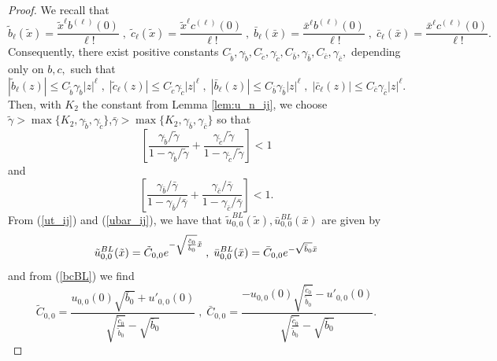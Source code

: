 \documentclass[12pt]{article}
\begin{document}
\begin{proof}
We recall that
\begin{equation*}
\tilde{b}_{\ell}(\tilde{x}) = \frac{\tilde{x}^{\ell} b^{(\ell)}(0)}{\ell !} \; , \; \tilde{c}_{\ell}(\tilde{x}) = \frac{\tilde{x}^{\ell} c^{(\ell)}(0)}{\ell !} \; , \; \bar{b}_{\ell}(\bar{x}) = \frac{\bar{x}^{\ell} b^{(\ell)}(0)}{\ell !} \; , \; \bar{c}_{\ell}(\bar{x}) = \frac{\bar{x}^{\ell} c^{(\ell)}(0)}{\ell !}.
\end{equation*}
Consequently, there exist positive constants $C_{\tilde{b}}, \gamma _{\tilde{b}}, C_{\tilde{c}}, \gamma _{\tilde{c}}, C_{\bar{b}}, \gamma _{\bar{b}}, C_{\bar{c}}, \gamma _{\bar{c}},$ depending only on $b,c,$ such that
\begin{equation*}
|\tilde{b}_{\ell}(z)| \leq C_{\tilde{b}} \gamma _{\tilde{b}} |z|^{\ell} \; , \; |\tilde{c}_{\ell}(z)| \leq C_{\tilde{c}} \gamma _{\tilde{c}} |z|^{\ell} \; , \; |\bar{b}_{\ell}(z)| \leq C_{\bar{b}} \gamma _{\bar{b}} |z|^{\ell} \; , \; |\bar{c}_{\ell}(z)| \leq C_{\bar{c}} \gamma _{\bar{c}} |z|^{\ell}.
\end{equation*}
Then, with $K_{2}$ the constant from Lemma \ref{lem:u_n_ij}, we choose $\tilde{\gamma } > \max \{ K_{2}, \gamma _{\tilde{b}}, \gamma _{\tilde{c}} \}$,$\bar{\gamma } > \max \{ K_{2}, \gamma _{\bar{b}}, \gamma _{\bar{c}} \}$ so that
\begin{equation*}
\left[ \frac{\gamma _{\tilde{b}} / \tilde{\gamma }}{1 - \gamma _{\tilde{b}} / \tilde{\gamma }} + \frac{\gamma _{\tilde{c}} / \tilde{\gamma }}{1 - \gamma _{\tilde{c}} / \tilde{\gamma }} \right] < 1
\end{equation*}
and
\begin{equation*}
\left[ \frac{\gamma _{\bar{b}} / \bar{\gamma }}{1 - \gamma _{\bar{b}} / \bar{\gamma }} + \frac{\gamma _{\bar{c}} / \bar{\gamma }}{1 - \gamma _{\bar{c}} / \bar{\gamma }} \right] < 1.
\end{equation*}
%
From (\ref{ut_ij}) and (\ref{ubar_ij}), we have that $\tilde{u}^{BL}_{0,0}(\tilde{x}),\bar{u}^{BL}_{0,0}(\bar{x})$ are given by 
\begin{equation*}
\tilde{u}^{BL}_{0,0}(\tilde{x})=\tilde{C}_{0,0}e^{-\sqrt{\frac{\tilde{c}_{0}}{%
\tilde{b}_{0}}}\tilde{x}}\; , \; \bar{u}^{BL}_{0,0}(\bar{x})=\bar{C}_{0,0}e^{-\sqrt{\bar{%
b}_{0}}\bar{x}}
\end{equation*}
and from (\ref{bcBL}) we find
%
\[
\tilde{C}_{0,0} = \frac{u_{0,0}(0) \sqrt{\bar{b}_0}+u'_{0,0}(0)}{\sqrt{\frac{\tilde{c}_0}{\tilde{b}_0}}-\sqrt{\bar{b}_0}} \; , \;
\bar{C}_{0,0} = \frac{-u_{0,0}(0) \sqrt{\frac{\tilde{c}_0}{\tilde{b}_0}}-u'_{0,0}(0)}{\sqrt{\frac{\tilde{c}_0}{\tilde{b}_0}}-\sqrt{\bar{b}_0}}.
\]
\end{proof}
\end{document}

